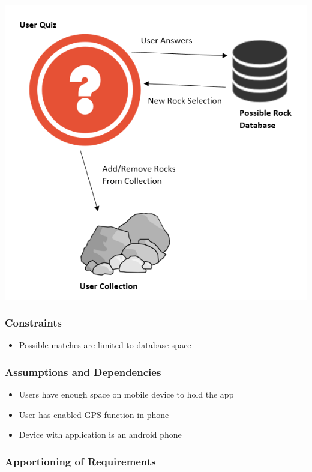 \documentclass[titlepage]{article}
\begin{document}
\includegraphics{Interaction.png}

\subsubsection{Constraints}

\begin{itemize}
\item Possible matches are limited to database space\\
\end{itemize}


\subsubsection{Assumptions and Dependencies}

\begin{itemize}
\item Users have enough space on mobile device to hold the app\\
\item User has enabled GPS function in phone\\
\item Device with application is an android phone\\
\end{itemize}


\subsubsection{Apportioning of Requirements}
\end{document}
